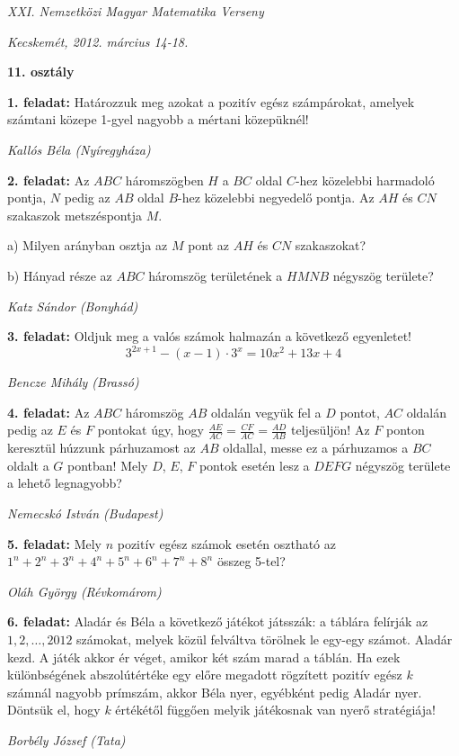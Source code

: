 \documentclass[a4paper,10pt]{article}
\def\ki#1#2{\hfill {\it #1 (#2)}\medskip}
\begin{document}
\begin{center} \Large {\em XXI. Nemzetközi Magyar Matematika Verseny} \end{center}
\begin{center} \large{\em Kecskemét, 2012. március 14-18.} \end{center}
\smallskip
\begin{center} \large{\bf 11. osztály} \end{center}
\bigskip 

{\bf 1. feladat: } Határozzuk meg azokat a pozitív egész számpárokat, amelyek számtani közepe 
1-gyel nagyobb a mértani közepüknél!

\ki{Kallós Béla}{Nyíregyháza}\medskip

{\bf 2. feladat: } Az $ABC$ háromszögben $H$ a $BC$ oldal $C$-hez közelebbi harmadoló pontja, $N$ pedig az $AB$ oldal $B$-hez közelebbi negyedelő pontja. Az $AH$ és $CN$ szakaszok metszéspontja $M$.

a) Milyen arányban osztja az $M$ pont az $AH$ és $CN$ szakaszokat?

b) Hányad része az $ABC$ háromszög területének a $HMNB$ négyszög területe?

\ki{Katz Sándor}{Bonyhád}\medskip

{\bf 3. feladat: } Oldjuk meg a valós számok halmazán a következő egyenletet!
$$3^{2x+1}-(x-1)\cdot 3^x=10x^2+13x+4$$

\ki{Bencze Mihály}{Brassó}\medskip

{\bf 4. feladat: } Az $ABC$ háromszög $AB$ oldalán vegyük fel a $D$ pontot, $AC$ oldalán pedig az $E$ és $F$ pontokat úgy, hogy
$\displaystyle{\frac{AE}{AC}=\frac{CF}{AC}=\frac{AD}{AB}}$
teljesüljön! Az $F$ ponton keresztül húzzunk párhuzamost az $AB$ oldallal,
messe ez a párhuzamos a $BC$ oldalt a $G$ pontban! Mely $D$, $E$, $F$ pontok esetén lesz a 
$DEFG$ négyszög területe a lehető legnagyobb?

\ki{Nemecskó István}{Budapest}\medskip

{\bf 5. feladat: } Mely $n$ pozitív egész számok esetén osztható az 
$1^n+2^n+3^n+4^n+5^n+6^n+7^n+8^n$ összeg 5-tel?

\ki{Oláh György}{Révkomárom}\medskip

{\bf 6. feladat: } Aladár és Béla a következő játékot játsszák: a táblára felírják az 
$1, 2,\dots, 2012$ számokat, melyek
közül felváltva törölnek le egy-egy számot. Aladár kezd. A játék akkor ér véget, amikor két szám
marad a táblán. Ha ezek különbségének abszolútértéke egy előre megadott rögzített pozitív egész $k$ számnál nagyobb prímszám, akkor Béla nyer, egyébként pedig Aladár nyer. Döntsük el, hogy $k$
értékétől függően melyik játékosnak van nyerő stratégiája!

\ki{Borbély József}{Tata}\medskip



\vfill
\end{document}

